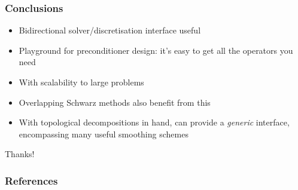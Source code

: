 \documentclass[presentation,aspectratio=43, 10pt]{beamer}
\begin{document}
\begin{frame}[fragile,t]
\begin{overlayarea}{\textwidth}{0.4\textheight}
\begin{onlyenv}
\begin{columns}[T]
\begin{column}{0.4\textwidth}
\begin{center}
      \end{center}
    \end{column}
  \end{columns}
    \end{onlyenv}
  \end{overlayarea}
\end{frame}

\begin{frame}
  \frametitle{Conclusions}
  \begin{itemize}
  \item Bidirectional solver/discretisation interface useful
  \item Playground for preconditioner design: it's easy to get all the
    operators you need
  \item With scalability to large problems
  \item Overlapping Schwarz methods also benefit from this
  \item With topological decompositions in hand, can provide a
    \emph{generic} interface, encompassing many useful smoothing schemes
  \end{itemize}

  \begin{center}
    Thanks!
  \end{center}
\end{frame}

\appendix
\begin{frame}[allowframebreaks]
  \frametitle{References}
  \printbibliography[heading=none]
\end{frame}
\end{document}
